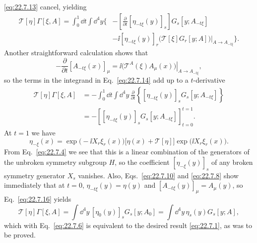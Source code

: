 \eqref{eq:22.7.13} cancel, yielding
\begin{equation}
 \begin{aligned}
 \mathcal T[\eta]\Gamma[\xi,A]
 =\int_0^1\dd t\int \dd^4y\Biggl\{
 &-\left[\frac{\partial}{\partial t}
 [\eta_{-t\xi}(y)]_s\right]G_s[y;A_{-t\xi}]
 \\
 &-\ii[\eta_{-t\xi}(y)]_r
 \left.
 \bigl(\mathcal T[\xi]G_r[y;A]\bigr)
 \right|_{A\to A_{-t\xi}}
 \Biggr\}.
 \end{aligned}
 \tag{22.7.14}\label{eq:22.7.14}
\end{equation}
Another straightforward calculation shows that
\begin{equation}
 -\frac{\partial}{\partial t}[A_{-t\xi}(x)]_\mu
 =\ii\left.
 \bigl(\mathcal T^A(\xi)A_\mu(x)\bigr)
 \right|_{A\to A_{-t\xi}},
 \tag{22.7.15}\label{eq:22.7.15}
\end{equation}
so the terms in the integrand in Eq.~\eqref{eq:22.7.14} add up to a
$t$-derivative
\begin{equation}
 \begin{aligned}
 \mathcal T[\eta]\Gamma[\xi,A]
 &=-\int_0^1 \dd t\int \dd^4y\,\frac{\partial}{\partial t}
 \left\{[\eta_{-t\xi}(y)]_sG_s[y;A_{-t\xi}]\right\}
 \\
 &=-\left[
 [\eta_{-t\xi}(y)]_sG_s[y;A_{-t\xi}]
 \right]_{t=0}^{t=1}.
 \end{aligned}
 \tag{22.7.16}\label{eq:22.7.16}
\end{equation}
At $t=1$ we have
\[
 \eta_{-\xi}(x)
 =\exp\bigl(-\ii X_r\xi_r(x)\bigr)
 \bigl[\eta(x)+\mathcal T[\eta]\bigr]
 \exp\bigl(\ii X_r\xi_r(x)\bigr).
\]
From Eq.~\eqref{eq:22.7.4} we see that this is a linear combination of
the generators of the unbroken symmetry subgroup $H$, so the coefficient
$[\eta_{-\xi}(y)]_s$ of any broken symmetry generator $X_s$ vanishes.
Also, Eqs.~\eqref{eq:22.7.10} and \eqref{eq:22.7.8} show immediately
that at $t=0$, $\eta_{-t\xi}(y)=\eta(y)$ and
$[A_{-t\xi}(y)]_\mu=A_\mu(y)$, so Eq.~\eqref{eq:22.7.16} yields
\begin{equation}
 \mathcal T[\eta]\Gamma[\xi,A]
 =\int \dd^4y\,[\eta_0(y)]_sG_s[y;A_0]
 =\int \dd^4y\,\eta_s(y)G_s[y;A],
 \tag{22.7.17}\label{eq:22.7.17}
\end{equation}
which with Eq.~\eqref{eq:22.7.6} is equivalent to the desired result
\eqref{eq:22.7.1}, as was to be proved.\par\medskip


